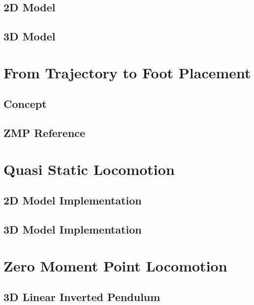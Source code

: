 \documentclass{UoNMCHA}
\begin{document}
		\subsection{2D Model}
			
		\subsection{3D Model}
			
	
	\clearpage	
	\newpage\section{From Trajectory to Foot Placement}\label{sec:Novel Method for Trajectory Tracking}
		
		\subsection{Concept}
			
		\clearpage\subsection{ZMP Reference}
			
	
	\clearpage
	\newpage\section{Quasi Static Locomotion}\label{sec:Quasi Static Locomotion}
		
		\subsection{2D Model Implementation}\label{sec:2D_QS}
			
		\subsection{3D Model Implementation}\label{sec:3D_QS}
			
			
	\clearpage
	\newpage\section{Zero Moment Point Locomotion}\label{sec:Zero Moment Point Locomotion}
		
		\subsection{3D Linear Inverted Pendulum}
			
\end{document}
